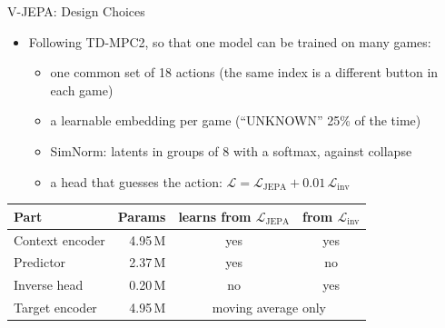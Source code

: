 \documentclass[aspectratio=43,10pt]{beamer}
\begin{document}
\begin{frame}{V-JEPA: Design Choices}
  \begin{itemize}\setlength\itemsep{0.3em}
    \item Following TD-MPC2, so that one model can be trained on many games:
      \begin{itemize}\small
        \item one common set of 18 actions (the same index is a different button in each game)
        \item a learnable embedding per game (``UNKNOWN'' 25\% of the time)
        \item SimNorm: latents in groups of 8 with a softmax, against collapse
        \item a head that guesses the action: $\mathcal{L}=\mathcal{L}_{\text{JEPA}}+0.01\,\mathcal{L}_{\text{inv}}$
      \end{itemize}
  \end{itemize}
  \vspace{0.3em}
  \centering
  {\footnotesize
  \begin{tabular}{@{}lrcc@{}}
    \toprule
    Part & Params & learns from $\mathcal{L}_{\text{JEPA}}$ & from $\mathcal{L}_{\text{inv}}$ \\
    \midrule
    Context encoder & 4.95\,M & yes & yes \\
    Predictor & 2.37\,M & yes & no \\
    Inverse head & 0.20\,M & no & yes \\
    Target encoder & 4.95\,M & \multicolumn{2}{c}{moving average only} \\
    \bottomrule
  \end{tabular}}
\end{frame}
\end{document}

